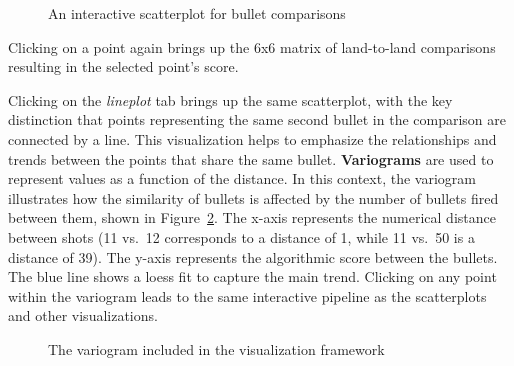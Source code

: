 \documentclass[
  12pt]{article}
\begin{document}
\begin{figure}


\caption{\label{fig-scatterplot}An interactive scatterplot for bullet
comparisons}

\end{figure}%

Clicking on a point again brings up the 6x6 matrix of land-to-land
comparisons resulting in the selected point's score.

Clicking on the \emph{lineplot} tab brings up the same scatterplot, with
the key distinction that points representing the same second bullet in
the comparison are connected by a line. This visualization helps to
emphasize the relationships and trends between the points that share the
same bullet. \hfill\newline \textbf{Variograms} are used to represent
values as a function of the distance. In this context, the variogram
illustrates how the similarity of bullets is affected by the number of
bullets fired between them, shown in Figure~\ref{fig-variogramA}. The
x-axis represents the numerical distance between shots (11 vs.~12
corresponds to a distance of 1, while 11 vs.~50 is a distance of 39).
The y-axis represents the algorithmic score between the bullets. The
blue line shows a loess fit to capture the main trend. Clicking on any
point within the variogram leads to the same interactive pipeline as the
scatterplots and other visualizations.

\begin{figure}


\caption{\label{fig-variogramA}The variogram included in the
visualization framework}

\end{figure}%
\end{document}
